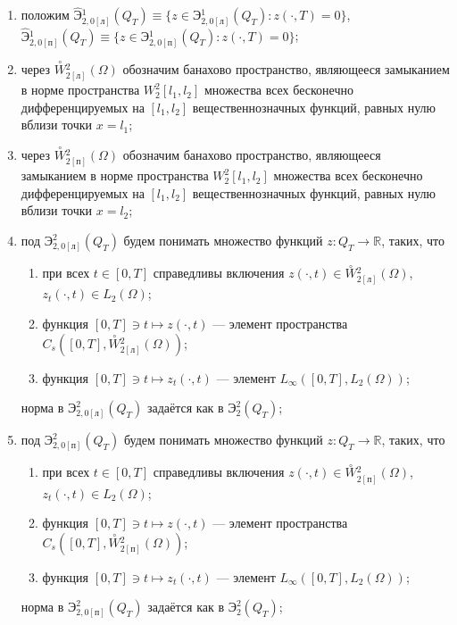 \documentclass{report}
\begin{document}
{\begin{enumerate}
    \item
положим $\hat{\textbf{Э}}{}^{1}_{2,0[\textrm{л}]}(Q_T)\equiv\{z\in {\textbf{Э}}{}^{1}_{2,0[\textrm{л}]}(Q_T):z(\cdot,T)=0\}$,
$\hat{\textbf{Э}}{}^{1}_{2,0[\textrm{п}]}(Q_T)\equiv\{z\in {\textbf{Э}}{}^{1}_{2,0[\textrm{п}]}(Q_T):z(\cdot,T)=0\}$;

    \item
через $\stackrel{\circ}{W}{\!\!\!}^2_{2[\textrm{л}]}(\Omega)$ обозначим банахово пространство, являющееся замыканием в норме пространства
$W^2_2[l_1,l_2]$ множества всех бесконечно дифференцируемых на $[l_1,l_2]$ вещественнозначных функций, равных нулю вблизи точки $x=l_1$;

    \item
через $\stackrel{\circ}{W}{\!\!\!}^2_{2[\textrm{п}]}(\Omega)$ обозначим банахово пространство, являющееся замыканием в норме пространства
$W^2_2[l_1,l_2]$ множества всех бесконечно дифференцируемых на $[l_1,l_2]$ вещественнозначных функций, равных нулю вблизи точки $x=l_2$;

    \item
под $\textrm{Э}^2_{2,0[\textrm{л}]}(Q_T)$ будем понимать множество функций $z:Q_T\to\mathbb{R}$, таких, что
\begin{enumerate}
    \item
при всех $t\in[0,T]$ справедливы включения $z(\cdot,t)\in\stackrel{\circ}{W}\!\!^2_{2[\textrm{л}]}(\Omega)$, $z_t(\cdot,t)\in L_2(\Omega)$;
    \item
функция $[0,T]\ni t\mapsto z(\cdot,t)$ --- элемент пространства $C_s([0,T],\stackrel{\circ}{W}\!\!^2_{2[\textrm{л}]}(\Omega))$;
    \item
функция  $[0,T]\ni t\mapsto z_t(\cdot,t)$ --- элемент $L_\infty([0,T],L_2(\Omega))$;
\end{enumerate}
норма в  $\textrm{Э}^2_{2,0[\textrm{л}]}(Q_T)$ задаётся как в $\textrm{Э}^2_{2}(Q_T)$;

    \item
под $\textrm{Э}^2_{2,0[\textrm{п}]}(Q_T)$ будем понимать множество функций $z:Q_T\to\mathbb{R}$, таких, что
\begin{enumerate}
    \item
при всех $t\in[0,T]$ справедливы включения $z(\cdot,t)\in\stackrel{\circ}{W}\!\!^2_{2[\textrm{п}]}(\Omega)$, $z_t(\cdot,t)\in L_2(\Omega)$;
    \item
функция $[0,T]\ni t\mapsto z(\cdot,t)$ --- элемент пространства $C_s([0,T],\stackrel{\circ}{W}\!\!^2_{2[\textrm{п}]}(\Omega))$;
    \item
функция  $[0,T]\ni t\mapsto z_t(\cdot,t)$ --- элемент $L_\infty([0,T],L_2(\Omega))$;
\end{enumerate}
норма в  $\textrm{Э}^2_{2,0[\textrm{п}]}(Q_T)$ задаётся как в $\textrm{Э}^2_{2}(Q_T)$;


\end{enumerate}}
\end{document}
